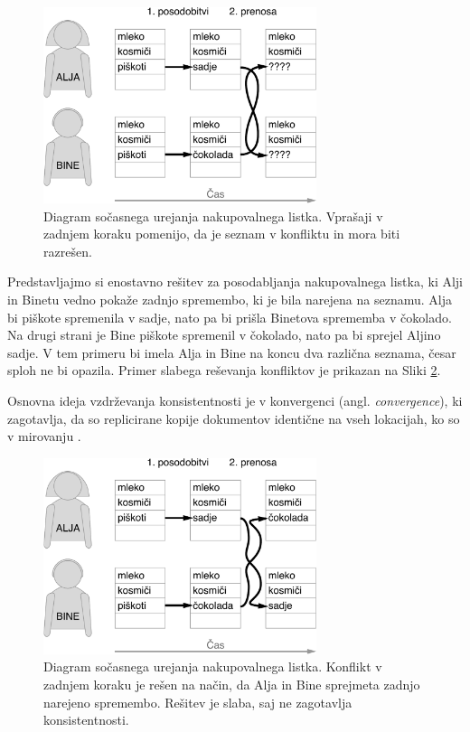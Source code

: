 \documentclass[a4paper, 12pt, twoside]{book}
\begin{document}
\begin{figure}[placement h]
\begin{center}
\includegraphics[width=8cm]{img/problem2.pdf}
\end{center}
\caption{Diagram sočasnega urejanja nakupovalnega listka. Vprašaji v zadnjem koraku pomenijo, da je seznam v konfliktu in mora biti razrešen. }
\label{problem2}
\end{figure}

Predstavljajmo si enostavno rešitev za posodabljanja nakupovalnega listka, ki Alji in Binetu vedno pokaže zadnjo spremembo, ki je bila narejena na seznamu. Alja bi piškote spremenila v sadje, nato pa bi prišla Binetova sprememba v čokolado. Na drugi strani je Bine piškote spremenil v čokolado, nato pa bi sprejel Aljino sadje. V tem primeru bi imela Alja in Bine na koncu dva različna seznama, česar sploh ne bi opazila. Primer slabega reševanja konfliktov je prikazan na Sliki \ref{problem3}.

Osnovna ideja vzdrževanja konsistentnosti je v konvergenci (angl. \textit{convergence}), ki zagotavlja, da so replicirane kopije dokumentov identične na vseh lokacijah, ko so v mirovanju \cite{wiki}.

\begin{figure}[placement h]
\begin{center}
\includegraphics[width=8cm]{img/problem3.pdf}
\end{center}
\caption{Diagram sočasnega urejanja nakupovalnega listka. Konflikt v zadnjem koraku je rešen na način, da Alja in Bine sprejmeta zadnjo narejeno spremembo. Rešitev je slaba, saj ne zagotavlja konsistentnosti. }
\label{problem3}
\end{figure}
\end{document}
